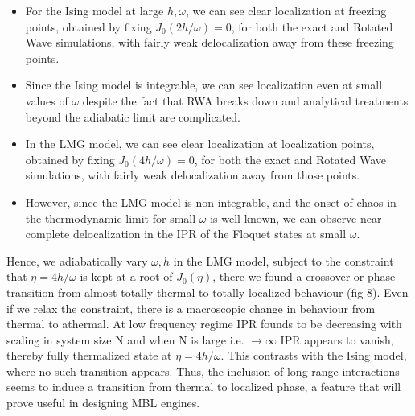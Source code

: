 \documentclass{article}
\begin{document}
\begin{itemize}

\item For the Ising model at large $h, \omega$, we can see clear localization at freezing points, obtained by fixing $J_0(2h/\omega)=0$,  for both the exact and Rotated Wave simulations, with fairly weak delocalization away from these freezing points. 

\item Since the Ising model is integrable, we can see localization even at small values of $\omega$ despite the fact that RWA breaks down and analytical treatments beyond the adiabatic limit are complicated.

\item In the LMG model, we can see clear localization at localization points, obtained by fixing $J_0(4h/\omega)=0$, for both the exact and Rotated Wave simulations, with fairly weak delocalization away from those points.

\item However, since the LMG model is non-integrable, and the onset of chaos in the thermodynamic limit for small $\omega$ is well-known, we can observe near complete delocalization in the IPR of the Floquet states at small $\omega$.
\end{itemize}

Hence, we adiabatically vary $\omega, h$ in the LMG model, subject to the constraint that $\eta=4h/\omega$ is kept at a root of $J_0(\eta)$, there we found a crossover or phase transition from almost totally thermal to totally localized behaviour (fig 8). Even if we relax the constraint, there is a macroscopic change in behaviour from thermal to athermal. At low frequency regime IPR founds to be decreasing with scaling in system size N and when N is large i.e. $\rightarrow{}\infty$ IPR appears to vanish, thereby fully thermalized state at $\eta=4h/\omega$.  This contrasts with the Ising model, where no such transition appears. Thus, the inclusion of long-range interactions seems to induce a transition from thermal to localized phase, a feature that will prove useful in designing MBL engines.




\printbibliography %
\end{document}
